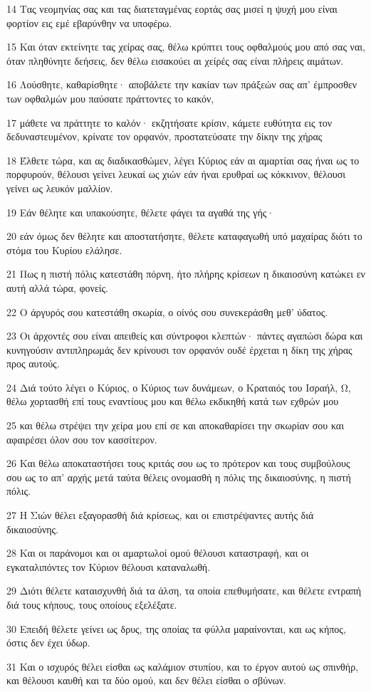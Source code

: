 \par 14 Τας νεομηνίας σας και τας διατεταγμένας εορτάς σας μισεί η ψυχή μου είναι φορτίον εις εμέ εβαρύνθην να υποφέρω.
\par 15 Και όταν εκτείνητε τας χείρας σας, θέλω κρύπτει τους οφθαλμούς μου από σας ναι, όταν πληθύνητε δεήσεις, δεν θέλω εισακούει αι χείρές σας είναι πλήρεις αιμάτων.
\par 16 Λούσθητε, καθαρίσθητε· αποβάλετε την κακίαν των πράξεών σας απ' έμπροσθεν των οφθαλμών μου παύσατε πράττοντες το κακόν,
\par 17 μάθετε να πράττητε το καλόν· εκζητήσατε κρίσιν, κάμετε ευθύτητα εις τον δεδυναστευμένον, κρίνατε τον ορφανόν, προστατεύσατε την δίκην της χήρας
\par 18 Έλθετε τώρα, και ας διαδικασθώμεν, λέγει Κύριος εάν αι αμαρτίαι σας ήναι ως το πορφυρούν, θέλουσι γείνει λευκαί ως χιών εάν ήναι ερυθραί ως κόκκινον, θέλουσι γείνει ως λευκόν μαλλίον.
\par 19 Εάν θέλητε και υπακούσητε, θέλετε φάγει τα αγαθά της γής·
\par 20 εάν όμως δεν θέλητε και αποστατήσητε, θέλετε καταφαγωθή υπό μαχαίρας διότι το στόμα του Κυρίου ελάλησε.
\par 21 Πως η πιστή πόλις κατεστάθη πόρνη, ήτο πλήρης κρίσεων η δικαιοσύνη κατώκει εν αυτή αλλά τώρα, φονείς.
\par 22 Ο άργυρός σου κατεστάθη σκωρία, ο οίνός σου συνεκεράσθη μεθ' ύδατος.
\par 23 Οι άρχοντές σου είναι απειθείς και σύντροφοι κλεπτών· πάντες αγαπώσι δώρα και κυνηγούσιν αντιπληρωμάς δεν κρίνουσι τον ορφανόν ουδέ έρχεται η δίκη της χήρας προς αυτούς.
\par 24 Διά τούτο λέγει ο Κύριος, ο Κύριος των δυνάμεων, ο Κραταιός του Ισραήλ, Ω, θέλω χορτασθή επί τους εναντίους μου και θέλω εκδικηθή κατά των εχθρών μου
\par 25 και θέλω στρέψει την χείρα μου επί σε και αποκαθαρίσει την σκωρίαν σου και αφαιρέσει όλον σου τον κασσίτερον.
\par 26 Και θέλω αποκαταστήσει τους κριτάς σου ως το πρότερον και τους συμβούλους σου ως το απ' αρχής μετά ταύτα θέλεις ονομασθή η πόλις της δικαιοσύνης, η πιστή πόλις.
\par 27 Η Σιών θέλει εξαγορασθή διά κρίσεως, και οι επιστρέψαντες αυτής διά δικαιοσύνης.
\par 28 Και οι παράνομοι και οι αμαρτωλοί ομού θέλουσι καταστραφή, και οι εγκαταλιπόντες τον Κύριον θέλουσι καταναλωθή.
\par 29 Διότι θέλετε καταισχυνθή διά τα άλση, τα οποία επεθυμήσατε, και θέλετε εντραπή διά τους κήπους, τους οποίους εξελέξατε.
\par 30 Επειδή θέλετε γείνει ως δρυς, της οποίας τα φύλλα μαραίνονται, και ως κήπος, όστις δεν έχει ύδωρ.
\par 31 Και ο ισχυρός θέλει είσθαι ως καλάμιον στυπίου, και το έργον αυτού ως σπινθήρ, και θέλουσι καυθή και τα δύο ομού, και δεν θέλει είσθαι ο σβύνων.

